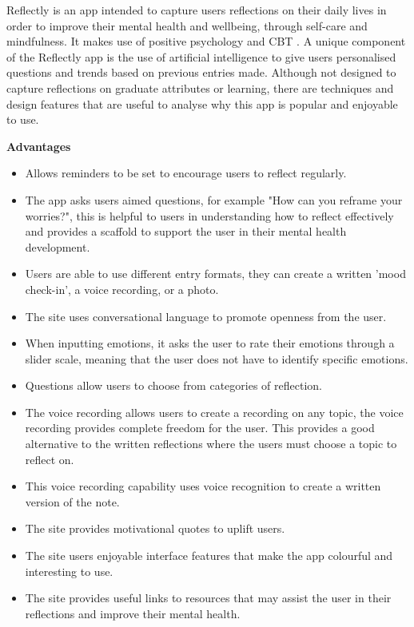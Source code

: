 \documentclass{l4proj}
\begin{document}
Reflectly is an app intended to capture users reflections on their daily lives in order to improve their mental health and wellbeing, through self-care and mindfulness. It makes use of positive psychology and CBT \citep{reflectly_app}. A unique component of the Reflectly app is the use of artificial intelligence to give users personalised questions and trends based on previous entries made. Although not designed to capture reflections on graduate attributes or learning, there are techniques and design features that are useful to analyse why this app is popular and enjoyable to use. 

\textbf{Advantages}
\begin{itemize}
    \item Allows reminders to be set to encourage users to reflect regularly.
    \item The app asks users aimed questions, for example "How can you reframe your worries?", this is helpful to users in understanding how to reflect effectively
    and provides a scaffold to support the user in their mental health development.
    \item Users are able to use different entry formats, they can create a written 'mood check-in', a voice recording, or a photo.
    \item The site uses conversational language to promote openness from the user.
    \item When inputting emotions, it asks the user to rate their emotions through a slider scale, meaning that the user does not have to identify specific emotions. 
    \item Questions allow users to choose from categories of reflection.
    \item The voice recording allows users to create a recording on any topic, the voice recording provides complete freedom for the user. This provides a good alternative to the written reflections where the users must choose a topic to reflect on.
    \item This voice recording capability uses voice recognition to create a written version of the note.
    \item The site provides motivational quotes to uplift users.
    \item The site users enjoyable interface features that make the app colourful and interesting to use.
    \item The site provides useful links to resources that may assist the user in their reflections and improve their mental health.
\end{itemize}
\end{document}
